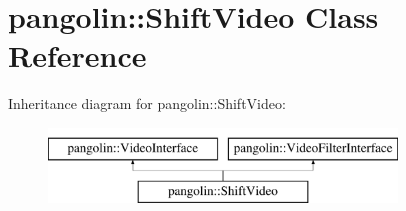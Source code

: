 \hypertarget{classpangolin_1_1_shift_video}{}\section{pangolin\+:\+:Shift\+Video Class Reference}
\label{classpangolin_1_1_shift_video}
Inheritance diagram for pangolin\+:\+:Shift\+Video\+:\begin{figure}[H]
\begin{center}
\leavevmode
\includegraphics[height=2.000000cm]{classpangolin_1_1_shift_video}
\end{center}
\end{figure}
